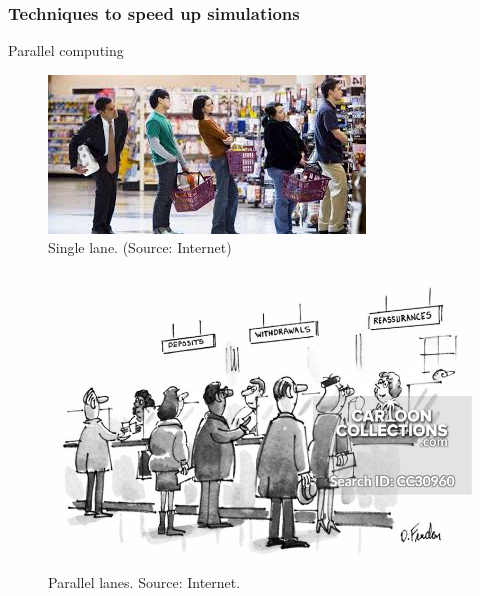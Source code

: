 \documentclass{beamer}
\begin{document}
\begin{frame}[fragile]\frametitle{Techniques to speed up simulations}

Parallel computing

\begin{minipage}[t]{0.4\linewidth}

\begin{figure}
\includegraphics[scale=0.4]{queue.jpeg}
\caption{{\scriptsize  Single lane. (Source: Internet)}}
\end{figure}

\end{minipage}
\hfill%
\begin{minipage}[t]{0.58\linewidth}
\begin{figure}
\includegraphics[scale=0.21]{parallel-queue.jpg}
\caption{{\scriptsize Parallel lanes. Source: Internet.}}
\end{figure}
\end{minipage}



\end{frame}
\end{document}
